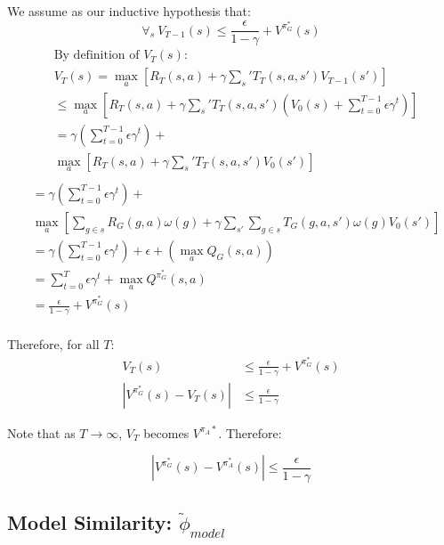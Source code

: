 \documentclass{article}
\newcommand{\ep}{\widetilde \phi}
\begin{document}
We assume as our inductive hypothesis that:
\begin{equation}
\forall_s\ V_{T-1}(s) \leq \frac{\epsilon}{1-\gamma} + V^{\pi_G^*}(s)
\end{equation}
\begin{align*}
&\text{By definition of $V_{T}(s)$:}\\
&V_{T}(s) = \max_a \left[R_{T}(s,a) + \gamma \sum_s' T_{T}(s,a,s')V_{T-1}(s')\right] \\
&\leq \max_a \left[R_{T}(s,a) + \gamma \sum_s' T_{T}(s,a,s')\left(V_0(s) + \sum_{t=0}^{T-1}\epsilon\gamma^t \right) \right] \\
&= \gamma\left(\sum_{t=0}^{T-1}\epsilon\gamma^{t}\right) + \\ &\max_a \left[R_{T}(s,a) + \gamma \sum_s' T_{T}(s,a,s')V_0(s') \right] \\
\end{align*}
\begin{align*}
&= \gamma\left(\sum_{t=0}^{T-1}\epsilon\gamma^t\right) + \\ &\max_a \left[\sum_{g \in s} R_{G}(g,a)\omega(g) + \gamma \sum_{s'} \sum_{g \in s}T_G(g,a,s')\omega(g)V_0(s') \right] \\
&= \gamma\left(\sum_{t=0}^{T-1}\epsilon\gamma^t\right) + \epsilon + \left(\max_a Q_G(s,a)\right) \\
&= \sum_{t=0}^{T} \epsilon \gamma^{t} + \max_a Q^{\pi_G^*}(s,a) \\
&= \frac{\epsilon}{1-\gamma} + V^{\pi_G^*}(s) \\
\end{align*}

Therefore, for all $T$:
\begin{align*}
V_{T}(s) &\leq \frac{\epsilon}{1-\gamma} + V^{\pi_G^*}(s) \\
|V^{\pi_G^*}(s) - V_{T}(s)| &\leq \frac{\epsilon}{1-\gamma}
\end{align*}

Note that as $T \rightarrow \infty$, $V_T$ becomes $V^{\pi_A*}$. Therefore:

\begin{equation}
|V^{\pi_G^*}(s) - V^{\pi_A^*}(s)| \leq \frac{\epsilon}{1-\gamma}
\end{equation}


\subsection{Model Similarity: $\ep_{model}$}
\end{document}
